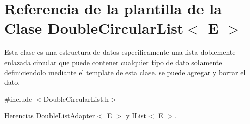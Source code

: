 \hypertarget{classDoubleCircularList}{\section{Referencia de la plantilla de la Clase Double\-Circular\-List$<$ E $>$}
\label{classDoubleCircularList}
}


Esta clase es una estructura de datos especificamente una lista doblemente enlazada circular que puede contener cualquier tipo de dato solamente definiciendolo mediante el template de esta clase. se puede agregar y borrar el dato.  




{\ttfamily \#include $<$Double\-Circular\-List.\-h$>$}



Herencias \hyperlink{classDoubleListAdapter}{Double\-List\-Adapter$<$ E $>$} y \hyperlink{classIList}{I\-List$<$ E $>$}.

